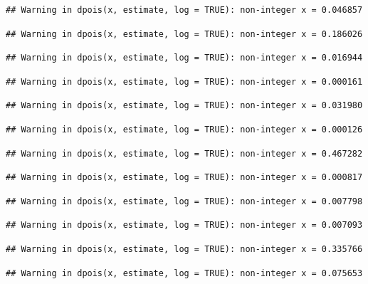 \documentclass[]{article}
\begin{document}
\begin{verbatim}
## Warning in dpois(x, estimate, log = TRUE): non-integer x = 0.046857
\end{verbatim}

\begin{verbatim}
## Warning in dpois(x, estimate, log = TRUE): non-integer x = 0.186026
\end{verbatim}

\begin{verbatim}
## Warning in dpois(x, estimate, log = TRUE): non-integer x = 0.016944
\end{verbatim}

\begin{verbatim}
## Warning in dpois(x, estimate, log = TRUE): non-integer x = 0.000161
\end{verbatim}

\begin{verbatim}
## Warning in dpois(x, estimate, log = TRUE): non-integer x = 0.031980
\end{verbatim}

\begin{verbatim}
## Warning in dpois(x, estimate, log = TRUE): non-integer x = 0.000126
\end{verbatim}

\begin{verbatim}
## Warning in dpois(x, estimate, log = TRUE): non-integer x = 0.467282
\end{verbatim}

\begin{verbatim}
## Warning in dpois(x, estimate, log = TRUE): non-integer x = 0.000817
\end{verbatim}

\begin{verbatim}
## Warning in dpois(x, estimate, log = TRUE): non-integer x = 0.007798
\end{verbatim}

\begin{verbatim}
## Warning in dpois(x, estimate, log = TRUE): non-integer x = 0.007093
\end{verbatim}

\begin{verbatim}
## Warning in dpois(x, estimate, log = TRUE): non-integer x = 0.335766
\end{verbatim}

\begin{verbatim}
## Warning in dpois(x, estimate, log = TRUE): non-integer x = 0.075653
\end{verbatim}
\end{document}
